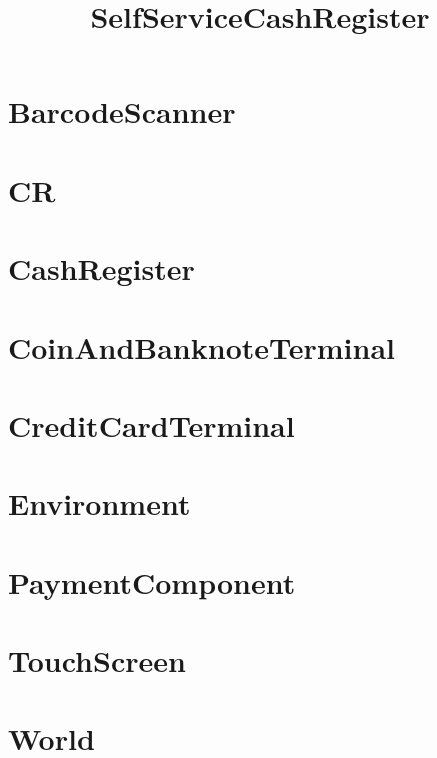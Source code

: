 \documentclass{article}
\begin{document}
\title{SelfServiceCashRegister}
\author{}
\maketitle
\tableofcontents

\section{BarcodeScanner}

\section{CR}

\section{CashRegister}

\section{CoinAndBanknoteTerminal}

\section{CreditCardTerminal}

\section{Environment}

\section{PaymentComponent}

\section{TouchScreen}

\section{World}

\end{document}
